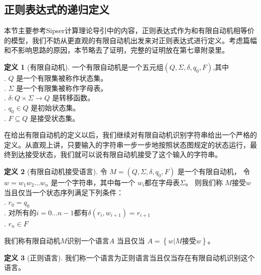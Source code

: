 \documentclass[openany,oneside]{book}
\theoremstyle{definition}
\newtheorem{definition}{\hspace{2em}定义}[chapter]
\theoremstyle{definition}
\begin{document}
\subsection{正则表达式的递归定义}
	本节主要参考Sipser\cite{Sips05a}计算理论导引中的内容，正则表达式作为和有限自动机相等价的模型，我们不妨从更直观的有限自动机出发来对正则表达式进行定义。考虑篇幅和不影响思路的原因，本节略去了证明，完整的证明放在第七章附录里。
	\begin{definition}[有限自动机]
		一个有限自动机是一个五元组\(\left( Q,\Sigma,\delta,q_0,F\right) \),其中\\
		\indent {}. \(Q\) 是一个有限集被称作状态集。\\
		\indent {}. \(\Sigma\) 是一个有限集被称作字母表。\\
		\indent {}. \(\delta : Q \times \Sigma \rightarrow Q\) 是转移函数。\\
		\indent {}. \(q_0 \in Q\) 是初始状态集。\\
		\indent {}. \(F \subseteq Q\) 是接受状态集。
	\end{definition}
	在给出有限自动机的定义以后，我们继续对有限自动机识别字符串给出一个严格的定义。从直观上讲，只要输入的字符串一步一步地按照状态图规定的状态运行，最终到达接受状态，我们就可以说有限自动机接受了这个输入的字符串。
	\begin{definition}[有限自动机接受语言]
		令 \(M = \left( Q,\Sigma,\delta,q_0,F\right)\) 是一个有限自动机， 令 \( w = w_1 w_2 ... w_n\) 是一个字符串，其中每一个 \(w_i\)都在字母表\(\Sigma\)。 则我们称 \(M\)接受\(w\)当且仅当一个状态序列满足下列条件：\\
		\indent {}. \(r_0 = q_0\)\\
		\indent {}. 对所有的\(i = 0... n -1\)都有\(\delta \left( r_i, w_{i+1}\right) = r_{i+1}\)\\
		\indent {}. \(r_n \in F\)
	\end{definition}
	我们称有限自动机\(M\)识别一个语言\(A\) 当且仅当 \(A = \left\lbrace w | M \mbox{接受} w\right\rbrace \)。\\
	\begin{definition}[正则语言]
		我们称一个语言为正则语言当且仅当存在有限自动机识别这个语言。
	\end{definition}
	
\end{document}
